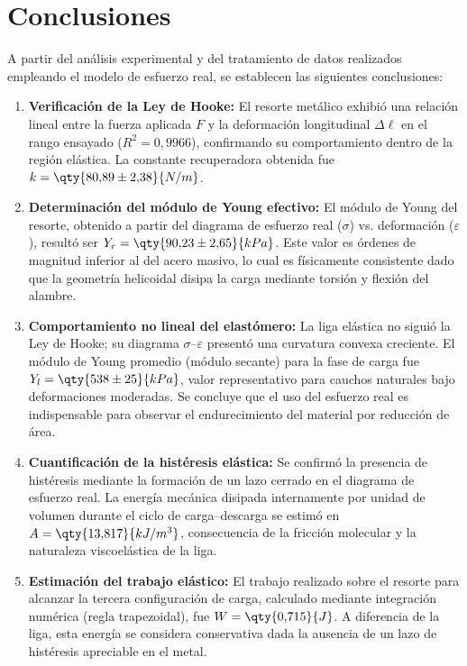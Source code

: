 
\section{Conclusiones}

A partir del análisis experimental y del tratamiento de datos realizados empleando el modelo de esfuerzo real, se establecen las siguientes conclusiones:

\begin{enumerate}

    \item \textbf{Verificación de la Ley de Hooke:}
    El resorte metálico exhibió una relación lineal entre la fuerza
    aplicada $F$ y la deformación longitudinal $\Delta\ell$ en el
    rango ensayado ($R^2 = 0{,}9966$), confirmando su comportamiento dentro de la región elástica. La constante recuperadora obtenida fue $k = \qty{80{,}89 \pm 2{,}38}{N/m}$.

    \item \textbf{Determinación del módulo de Young efectivo:}
    El módulo de Young del resorte, obtenido a partir del diagrama de esfuerzo real ($\sigma$) vs. deformación ($\varepsilon$), resultó ser $Y_r = \qty{90{,}23 \pm 2{,}65}{kPa}$. Este valor es órdenes de magnitud inferior al del acero masivo, lo cual es físicamente consistente dado que la geometría helicoidal disipa la carga mediante torsión y flexión del alambre.

    \item \textbf{Comportamiento no lineal del elastómero:}
    La liga elástica no siguió la Ley de Hooke; su diagrama $\sigma$--$\varepsilon$ presentó una curvatura convexa creciente. El módulo de Young promedio (módulo secante) para la fase de carga fue $Y_l = \qty{538 \pm 25}{kPa}$, valor representativo para cauchos naturales bajo deformaciones moderadas. Se concluye que el uso del esfuerzo real es indispensable para observar el endurecimiento del material por reducción de área.

    \item \textbf{Cuantificación de la histéresis elástica:}
    Se confirmó la presencia de histéresis mediante la formación de un lazo cerrado en el diagrama de esfuerzo real. La energía mecánica disipada internamente por unidad de volumen durante el ciclo de carga--descarga se estimó en $A = \qty{13{,}817}{kJ/m^3}$, consecuencia de la fricción molecular y la naturaleza viscoelástica de la liga.

    \item \textbf{Estimación del trabajo elástico:}
    El trabajo realizado sobre el resorte para alcanzar la tercera
    configuración de carga, calculado mediante integración numérica (regla trapezoidal), fue $W = \qty{0{,}715}{J}$. A diferencia de la liga, esta energía se considera conservativa dada la ausencia de un lazo de histéresis apreciable en el metal.

\end{enumerate}